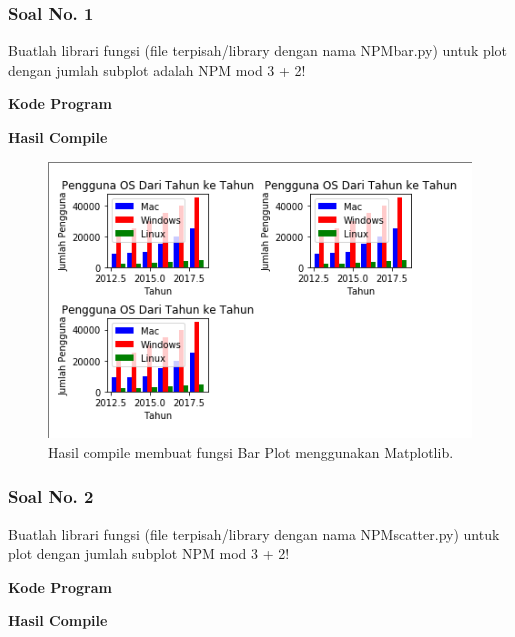 \subsubsection{Soal No. 1}
\hfill \break
Buatlah librari fungsi (file terpisah/library dengan nama NPMbar.py) untuk plot dengan jumlah subplot adalah NPM mod 3 + 2!

\hfill \break
\textbf{Kode Program}



\hfill \break
\textbf{Hasil Compile}

\begin{figure}[H]
	\includegraphics[width=12cm]{figures/6/1174089/Praktek/p1.png}
	\centering
	\caption{Hasil compile membuat fungsi Bar Plot menggunakan Matplotlib.}
\end{figure}

\subsubsection{Soal No. 2}
\hfill \break
Buatlah librari fungsi (file terpisah/library dengan nama NPMscatter.py) untuk plot dengan jumlah subplot NPM mod 3 + 2!

\hfill \break
\textbf{Kode Program}



\hfill \break
\textbf{Hasil Compile}


